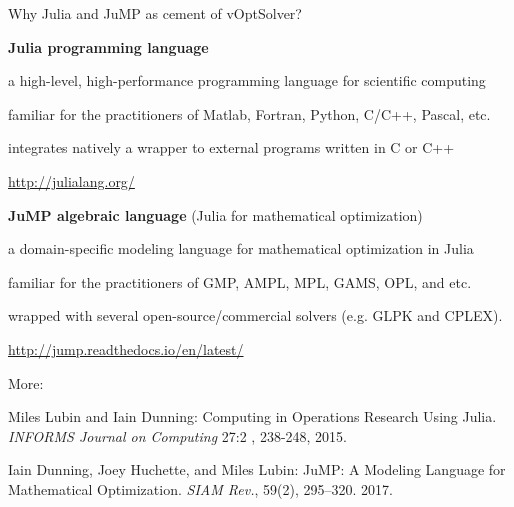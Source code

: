 \documentclass[10pt,xcolor=dvipsnames]{beamer}
\begin{document}
\begin{frame}{Why Julia and JuMP as cement of vOptSolver?}

\textbf{Julia programming language}
\begin{itemize}
\footnotesize{
    \item a high-level, high-performance programming language for scientific computing\vspace{-1mm}
    \item familiar for the practitioners of Matlab, Fortran, Python, C/C++, Pascal, etc.\vspace{-1mm}
    \item integrates natively a wrapper to external programs written in C or C++ \vspace{-1mm}
    \item  \url{http://julialang.org/}
}
\end{itemize}

\medskip

\textbf{JuMP algebraic language} (Julia for mathematical optimization)
\begin{itemize}
\footnotesize{
    \item a domain-specific modeling language for mathematical optimization in Julia\vspace{-1mm}
    \item familiar for the practitioners of GMP, AMPL, MPL, GAMS, OPL, and etc.\vspace{-1mm}
    \item wrapped with several open-source/commercial solvers (e.g. GLPK and CPLEX).\vspace{-1mm}
    \item  \url{http://jump.readthedocs.io/en/latest/}
    }
\end{itemize}

\medskip

More:\\
\footnotesize{
Miles Lubin and Iain Dunning:
Computing in Operations Research Using Julia.
\textit{INFORMS Journal on Computing} 27:2 , 238-248, 2015.

Iain Dunning, Joey Huchette, and Miles Lubin: 
JuMP: A Modeling Language for Mathematical Optimization.
 \textit{SIAM Rev.}, 59(2), 295--320. 2017.
}
    
\end{frame}
\end{document}
